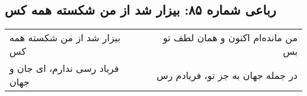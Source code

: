 \begin{center}
\section*{رباعی شماره ۸۵: بیزار شد از من شکسته همه کس}
\label{sec:085}
\begin{longtable}{l p{0.5cm} r}
بیزار شد از من شکسته همه کس
&&
من مانده‌ام اکنون و همان لطف تو بس
\\
فریاد رسی ندارم، ای جان و جهان
&&
در جمله جهان به جز تو، فریادم رس
\\
\end{longtable}
\end{center}

